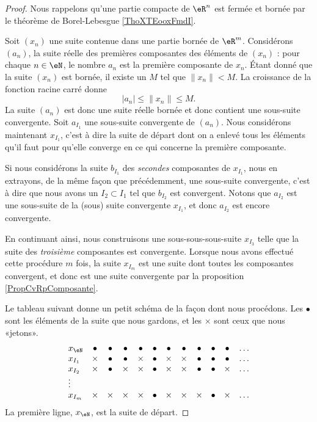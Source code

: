 \begin{proof}
    Nous rappelons qu'une partie compacte de \( \eR^n\) est fermée et bornée par le théorème de Borel-Lebesgue \ref{ThoXTEooxFmdI}.

    Soit $(x_n)$ une suite contenue dans une partie bornée de $\eR^m$. Considérons $(a_n)$, la suite réelle des premières composantes des éléments de $(x_n)$ : pour chaque $n\in\eN$, le nombre $a_n$ est la première composante de $x_n$. Étant donné que la suite $(x_n)$ est bornée, il existe un $M$ tel que $\| x_n \|<M$. La croissance de la fonction racine carré donne
	\begin{equation}
        | a_n |\leq\| x_n \|\leq M.
	\end{equation}
	La suite $(a_n)$ est donc une suite réelle bornée et donc contient une sous-suite convergente. Soit $a_{I_1}$ une sous-suite convergente de $(a_n)$. Nous considérons maintenant $x_{I_1}$, c'est à dire la suite de départ dont on a enlevé tous les éléments qu'il faut pour qu'elle converge en ce qui concerne la première composante.

	Si nous considérons la suite $b_{I_1}$ des \emph{secondes} composantes de $x_{I_1}$, nous en extrayons, de la même façon que précédemment, une sous-suite convergente, c'est à dire que nous avons un $I_2\subset I_1$ tel que $b_{I_2}$ est convergent. Notons que $a_{I_2}$ est une sous-suite de la (sous) suite convergente $x_{I_1}$, et donc $a_{I_2}$ est encore convergente.

	En continuant ainsi, nous construisons une sous-sous-sous-suite $x_{I_3}$ telle que la suite des \emph{troisième} composantes est convergente. Lorsque nous avons effectué cette procédure $m$ fois, la suite $x_{I_m}$ est une suite dont toutes les composantes convergent, et donc est une suite convergente par la proposition \ref{PropCvRpComposante}.
	
	Le tableau suivant donne un petit schéma de la façon dont nous procédons. Les $\bullet$ sont les éléments de la suite que nous gardons, et les $\times$ sont ceux que nous «jetons».
	\begin{equation}
		\begin{array}{lccccccccccc}
			x_{\eN}	&	\bullet&\bullet&\bullet&\bullet&\bullet&\bullet&\bullet&\bullet&\bullet&\bullet&\ldots\\
			x_{I_1}	&	\times&\bullet&\bullet&\times&\bullet&\times&\times&\bullet&\bullet&\bullet&\ldots\\
			x_{I_2}	&	\times&\bullet&\times&\times&\bullet&\times&\times&\bullet&\bullet&\times&\ldots\\
			\vdots\\
			x_{I_m}	&	\times&\times&\times&\times&\bullet&\times&\times&\times&\bullet&\times&\ldots
		\end{array}
	\end{equation}
	La première ligne, $x_{\eN}$, est la suite de départ.
\end{proof}

